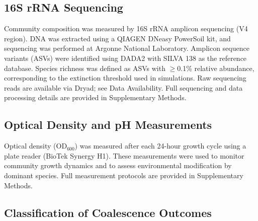 \subsection*{16S rRNA Sequencing}
\label{sec:methods:sequencing}

Community composition was measured by 16S rRNA amplicon sequencing (V4 region). DNA was extracted using a QIAGEN DNeasy PowerSoil kit, and sequencing was performed at Argonne National Laboratory. Amplicon sequence variants (ASVs) were identified using DADA2\citep{Callahan2016} with SILVA 138\citep{Quast2013} as the reference database.  Species richness was defined as ASVs with $\geq$0.1\% relative abundance, corresponding to the extinction threshold used in simulations. Raw sequencing reads are available via Dryad; see Data Availability. Full sequencing and data processing details are provided in Supplementary Methods.


\subsection*{Optical Density and pH Measurements}
\label{sec:methods:od_ph}

Optical density (OD$_{600}$) was measured after each 24-hour growth cycle using a plate reader (BioTek Synergy H1).  These measurements were used to monitor community growth dynamics and to assess environmental modification by dominant species. Full measurement protocols are provided in Supplementary Methods.


\subsection*{Classification of Coalescence Outcomes}
\label{sec:methods:classification}

